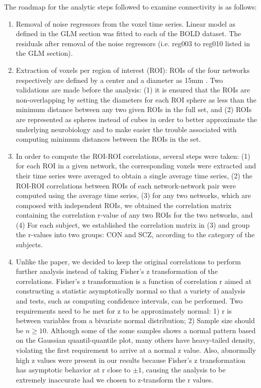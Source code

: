 \documentclass[11pt]{article}
\begin{document}
The roadmap for the analytic steps followed to examine connectivity is as
follows:

\begin{enumerate}
  \item Removal of noise regressors from the voxel time series. Linear model as
    defined in the GLM section was fitted to each of the BOLD dataset. The
    residuals after removal of the noise regressors (i.e. reg003 to reg010
    listed in the GLM section).
  \item Extraction of voxels per region of interest (ROI): ROIs of the four
    networks respectively are defined by a center and a diameter as 15mm \cite{repovs2012}. Two 
    validations are made before the analysis: (1) it is ensured that the ROIs are non-overlapping by 
    setting the diameters for each ROI sphere as less than the minimum distance between any two given 
    ROIs in the full set, and (2) ROIs are represented as spheres instead of cubes in
    order to better approximate the underlying neurobiology and to make easier the
    trouble associated with computing minimum distances between the ROIs in the set.
  \item In order to compute the ROI-ROI correlations, several steps were
    taken: (1) for each ROI in a given network, the corresponding voxels were
    extracted and their time series were averaged to obtain a single average time
    series, (2) the ROI-ROI correlations between ROIs of each network-network pair 
    were computed using the average time series, (3) for any two networks, which are 
    composed with independent ROIs, we obtained the correlation matrix containing 
    the correlation r-value of any two ROIs for the two networks, and (4) For each 
    subject, we established the correlation matrix in (3) and group the r-values into 
    two groups: CON and SCZ, according to the category of the subjects.  
  \item Unlike the paper, we decided to keep the original correlations to perform 
    further analysis instead of taking Fisher's z transformation of the correlations. 
    Fisher's z transformation is a function of correlation r aimed at constructing a 
    statistic asymptotically normal so that a variety of analysis and tests, such 
    as computing confidence intervals, can be performed. Two requirements need to be 
    met for z to be approximately normal: 1) r is between variables from a bivariate 
    normal distribution; 2) Sample size should be $n \geq 10$. Although some of the some 
    samples shows a normal pattern based on the Gaussian quantil-quantile plot, many others 
    have heavy-tailed density, violating the first requirement to arrive at a normal z 
    value. Also, abnormally high z values were present in our results because Fisher's z
    transformation has asymptotic behavior at r close to $ \pm 1$, causing the analysis to be
    extremely inaccurate had we chosen to z-transform the r values.
\end{enumerate}
\end{document}
